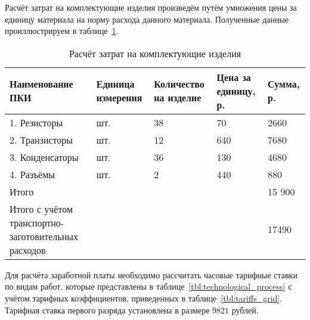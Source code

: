 Расчёт затрат на комплектующие изделия произведём путём умножения цены за единицу
материала на норму расхода данного материала. Полученные данные проиллюстрируем
в таблице~\ref{tbl:set_costs_result}.

\begin{table}[h!]
  \caption{Расчёт затрат на комплектующие изделия}
  \label{tbl:set_costs_result}
  \centering
  \small{
    \begin{tabular}{| p{} | p{} |
                      p{} | p{} | p{} |}
      \hline
      Наименование ПКИ & Единица \newline измерения &
      Количество \newline на изделие & Цена за \newline единицу, р. &
      Сумма, р. \\ \hline

      1. Резисторы                & шт. & 38 & 70   & 2660   \\ \hline
      2. Транзисторы              & шт. & 12 & 640  & 7680   \\ \hline
      3. Конденсаторы             & шт. & 36 & 130  & 4680   \\ \hline
      4. Разъёмы                  & шт. & 2  & 440  & 880    \\ \hline
      Итого                       &    &       &    & 15 900 \\ \hline
      Итого с учётом \newline
      транспортно-заготовительных расходов & & & & 17490     \\ \hline

    \end{tabular}
  }
\end{table}

\newpage

Для расчёта заработной платы необходимо рассчитать часовые тарифные ставки по
видам работ, которые представлены в таблице~\ref{tbl:technological_process}
с учётом тарифных коэффициентов, приведенных в таблице~\ref{tbl:tariffs_grid}.
Тарифная ставка первого разряда установлена в размере $ 9821 $ рублей.

